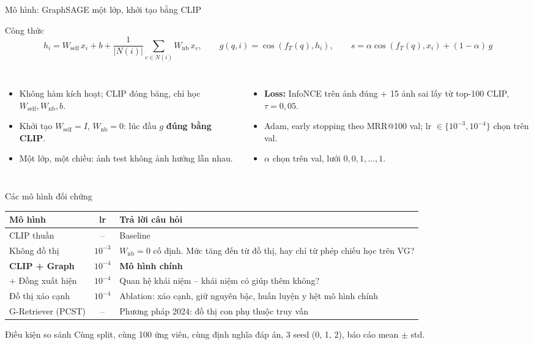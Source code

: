 \documentclass[10pt, aspectratio=169]{beamer}
\makeatletter
\newcommand{\mrr}{MRR@100}
\makeatother
\begin{document}
\begin{frame}{Mô hình: GraphSAGE một lớp, khởi tạo bằng CLIP}
  \begin{block}{Công thức}
    \[
      h_i = W_{\text{self}}\,x_i + b + \frac{1}{|N(i)|}\sum_{c\in N(i)} W_{\text{nb}}\,x_c,
      \qquad g(q,i)=\cos(f_T(q),h_i),
      \qquad s = \alpha\cos(f_T(q),x_i) + (1-\alpha)\,g
    \]
  \end{block}
  \begin{columns}[T]
      \begin{itemize}
        \item Không hàm kích hoạt; CLIP đóng băng, chỉ học $W_{\text{self}}, W_{\text{nb}}, b$.
        \item Khởi tạo $W_{\text{self}}=I$, $W_{\text{nb}}=0$: lúc đầu $g$ \textbf{đúng bằng CLIP}.
        \item Một lớp, một chiều: ảnh test không ảnh hưởng lẫn nhau.
      \end{itemize}
      \begin{itemize}
        \item \textbf{Loss:} InfoNCE trên ảnh đúng + 15 ảnh sai lấy từ top-100 CLIP, $\tau = 0{,}05$.
        \item Adam, early stopping theo \mrr{} val; lr $\in\{10^{-3},10^{-4}\}$ chọn trên val.
        \item $\alpha$ chọn trên val, lưới $0, 0{,}1, \dots, 1$.
      \end{itemize}
  \end{columns}
\end{frame}


\begin{frame}{Các mô hình đối chứng}
  \centering\small
  \begin{tabular}{l c p{8.2cm}}
    \toprule
    \textbf{Mô hình} & \textbf{lr} & \textbf{Trả lời câu hỏi} \\
    \midrule
    CLIP thuần & -- & Baseline \\
    Không đồ thị & $10^{-3}$ & $W_{\text{nb}} = 0$ cố định. Mức tăng đến từ đồ thị, hay chỉ từ phép chiếu học trên VG? \\
    \textbf{CLIP + Graph} & $10^{-4}$ & \textbf{Mô hình chính} \\
    + Đồng xuất hiện & $10^{-4}$ & Quan hệ khái niệm -- khái niệm có giúp thêm không? \\
    Đồ thị xáo cạnh & $10^{-4}$ & Ablation: xáo cạnh, giữ nguyên bậc, huấn luyện y hệt mô hình chính \\
    G-Retriever (PCST) & -- & Phương pháp 2024: đồ thị con phụ thuộc truy vấn \\
    \bottomrule
  \end{tabular}
  \vfill
  \begin{block}{Điều kiện so sánh}
    Cùng split, cùng 100 ứng viên, cùng định nghĩa đáp án, 3 seed (0, 1, 2), báo cáo mean $\pm$ std.
  \end{block}
\end{frame}
\end{document}
